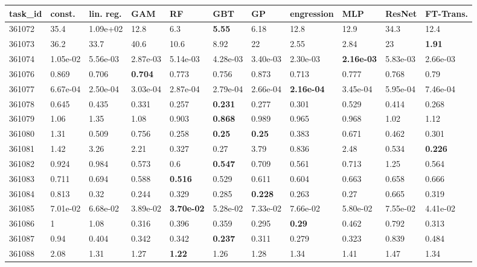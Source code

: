 \begin{table}[ht!]
\centering
\begingroup\footnotesize
\begin{tabular}{lllllllllll}
  \hline
\hline
task\_id & const. & lin. reg. & GAM & RF & GBT & GP & engression & MLP & ResNet & FT-Trans. \\ 
  \hline
361072 & 35.4 & 1.09e+02 & 12.8 & 6.3 & \textbf{5.55} & 6.18 & 12.8 & 12.9 & 34.3 & 12.4 \\ 
  361073 & 36.2 & 33.7 & 40.6 & 10.6 & 8.92 & 22 & 2.55 & 2.84 & 23 & \textbf{1.91} \\ 
  361074 & 1.05e-02 & 5.56e-03 & 2.87e-03 & 5.14e-03 & 4.28e-03 & 3.40e-03 & 2.30e-03 & \textbf{2.16e-03} & 5.83e-03 & 2.66e-03 \\ 
  361076 & 0.869 & 0.706 & \textbf{0.704} & 0.773 & 0.756 & 0.873 & 0.713 & 0.777 & 0.768 & 0.79 \\ 
  361077 & 6.67e-04 & 2.50e-04 & 3.03e-04 & 2.87e-04 & 2.79e-04 & 2.66e-04 & \textbf{2.16e-04} & 3.45e-04 & 5.95e-04 & 7.46e-04 \\ 
  361078 & 0.645 & 0.435 & 0.331 & 0.257 & \textbf{0.231} & 0.277 & 0.301 & 0.529 & 0.414 & 0.268 \\ 
  361079 & 1.06 & 1.35 & 1.08 & 0.903 & \textbf{0.868} & 0.989 & 0.965 & 0.968 & 1.02 & 1.12 \\ 
  361080 & 1.31 & 0.509 & 0.756 & 0.258 & \textbf{0.25} & \textbf{0.25} & 0.383 & 0.671 & 0.462 & 0.301 \\ 
  361081 & 1.42 & 3.26 & 2.21 & 0.327 & 0.27 & 3.79 & 0.836 & 2.48 & 0.534 & \textbf{0.226} \\ 
  361082 & 0.924 & 0.984 & 0.573 & 0.6 & \textbf{0.547} & 0.709 & 0.561 & 0.713 & 1.25 & 0.564 \\ 
  361083 & 0.711 & 0.694 & 0.588 & \textbf{0.516} & 0.529 & 0.611 & 0.604 & 0.663 & 0.658 & 0.666 \\ 
  361084 & 0.813 & 0.32 & 0.244 & 0.329 & 0.285 & \textbf{0.228} & 0.263 & 0.27 & 0.665 & 0.319 \\ 
  361085 & 7.01e-02 & 6.68e-02 & 3.89e-02 & \textbf{3.70e-02} & 5.28e-02 & 7.33e-02 & 7.66e-02 & 5.80e-02 & 7.55e-02 & 4.41e-02 \\ 
  361086 & 1 & 1.08 & 0.316 & 0.396 & 0.359 & 0.295 & \textbf{0.29} & 0.462 & 0.792 & 0.313 \\ 
  361087 & 0.94 & 0.404 & 0.342 & 0.342 & \textbf{0.237} & 0.311 & 0.279 & 0.323 & 0.839 & 0.484 \\ 
  361088 & 2.08 & 1.31 & 1.27 & \textbf{1.22} & 1.26 & 1.28 & 1.34 & 1.41 & 1.47 & 1.34 \\ 

\end{tabular}
\end{table}

